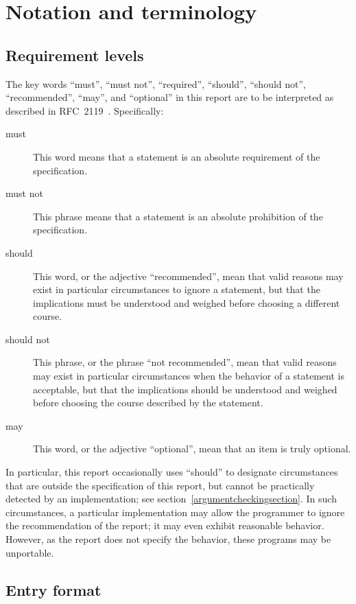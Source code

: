 \chapter{Notation and terminology}
\label{terminologychapter}

\section{Requirement levels} 
\label{requirementsection}

The key words ``must'', ``must not'', ``required'', ``should'',
``should not'', ``recommended'', ``may'', and ``optional'' in this
report are to be interpreted as described in RFC~2119~\cite{mustard}.
Specifically:

\begin{description}
\item[must] This word means that a statement is an absolute
  requirement of the specification.
\item[must not] This phrase means that a statement is an absolute
  prohibition of the specification.
\item[should] This word, or the adjective ``recommended'', mean that
  valid reasons may exist in particular circumstances to ignore a
  statement, but that the implications must be understood and weighed
  before choosing a different course.
\item[should not] This phrase, or the phrase ``not recommended'', mean
  that valid reasons may exist in particular circumstances when the
  behavior of a statement is acceptable, but that the implications
  should be understood and weighed before choosing the course described
  by the statement.
\item[may] This word, or the adjective ``optional'', mean that an item
  is truly optional.
\end{description}

In particular, this report occasionally uses ``should'' to designate
circumstances that are outside the specification of this report, but
cannot be practically detected by an implementation; see
section~\ref{argumentcheckingsection}.  In such circumstances, a
particular implementation may allow the programmer to ignore the
recommendation of the report; it may even exhibit reasonable behavior.
However, as the report does not specify the behavior,
these programs may be unportable.

\section{Entry format}
\label{entryformatsection}

